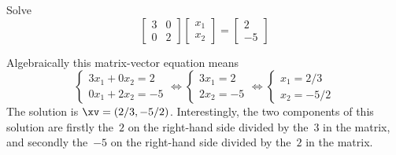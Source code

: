 \begin{example} \label{eg:}
Solve \begin{equation*}
\begin{bmatrix} 3&0\\0&2 \end{bmatrix}
\begin{bmatrix} x_1\\x_2 \end{bmatrix}
=\begin{bmatrix} 2\\-5 \end{bmatrix}
\end{equation*}
\begin{solution}
Algebraically this matrix-vector equation means
\begin{equation*}
\begin{cases} 3x_1+0x_2=2 \\ 0x_1+2x_2=-5\end{cases}
\iff
\begin{cases} 3x_1=2 \\ 2x_2=-5\end{cases}
\iff
\begin{cases} x_1=2/3 \\ x_2=-5/2\end{cases}
\end{equation*}
The solution is \(\xv=(2/3,-5/2)\).
Interestingly, the two components of this solution are firstly the~\(2\) on the right-hand side divided by the~\(3\) in the matrix, and secondly the~\(-5\) on the right-hand side divided by the~\(2\) in the matrix.
\end{solution}
\end{example}






